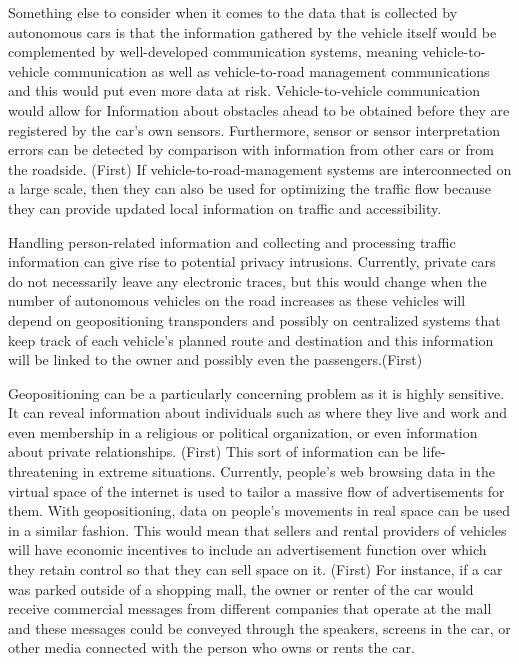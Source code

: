 \documentclass[10pt,twocolumn]{article}
\begin{document}
Something else to consider when it comes to the data that is collected by autonomous cars is that the information gathered by the vehicle itself would be complemented by well-developed communication systems, meaning vehicle-to-vehicle communication as well as vehicle-to-road management communications and this would put even more data at risk. Vehicle-to-vehicle communication would allow for Information about obstacles ahead to be obtained before they are registered by the car’s own sensors. Furthermore, sensor or sensor interpretation errors can be detected by comparison with information from other cars or from the roadside. (First) If vehicle-to-road-management systems are interconnected on a large scale, then they can also be used for optimizing the traffic flow because they can provide updated local information on traffic and accessibility.

Handling person-related information and collecting and processing traffic information can give rise to potential privacy intrusions. Currently, private cars do not necessarily leave any electronic traces, but this would change when the number of autonomous vehicles on the road increases as these vehicles will depend on geopositioning transponders and possibly on centralized systems that keep track of each vehicle’s planned route and destination and this information will be linked to the owner and possibly even the passengers.(First) 

Geopositioning can be a particularly concerning problem as it is highly sensitive. It can reveal information about individuals such as where they live and work and even membership in a religious or political organization, or even information about private relationships. (First) This sort of information can be life-threatening in extreme situations. Currently, people’s web browsing data in the virtual space of the internet is used to tailor a massive flow of advertisements for them. With geopositioning, data on people’s movements in real space can be used in a similar fashion. This would mean that sellers and rental providers of vehicles will have economic incentives to include an advertisement function over which they retain control so that they can sell space on it. (First) For instance, if a car was parked outside of a shopping mall, the owner or renter of the car would receive commercial messages from different companies that operate at the mall and these messages could be conveyed through the speakers, screens in the car, or other media connected with the person who owns or rents the car.
\end{document}
